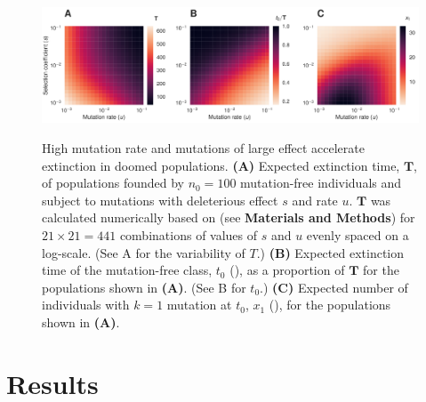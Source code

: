 \documentclass[9pt,lineno]{elife}
\begin{document}
\begin{figure}[ht!]
\includegraphics[width=\linewidth]{heat.pdf}
\caption{High mutation rate and mutations of large effect accelerate extinction in doomed populations.  
%
\textbf{(A)} Expected extinction time, $\mathbf{T}$, of populations founded by $n_0=100$ mutation-free individuals and subject to mutations with deleterious effect $s$ and rate $u$.  $\mathbf{T}$ was calculated numerically based on  (see \textbf{Materials and Methods}) for $21\times21=441$ combinations of values of $s$ and $u$ evenly spaced on a log-scale.  (See A for the variability of $T$.)
%
\textbf{(B)} Expected extinction time of the mutation-free class, $t_0$ (), as a proportion of $\mathbf{T}$ for the populations shown in \textbf{(A)}.  (See B for $t_0$.)
%
\textbf{(C)} Expected number of individuals with $k=1$ mutation at $t_0$, $x_1$ (), for the populations shown in \textbf{(A)}.
}
\label{fig:heat}
\label{figsupp:sf3}
\end{figure}




\section{Results}
\end{document}
